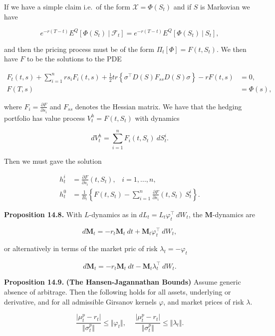 \documentclass[
]{article}
\begin{document}
If we have a simple claim i.e.~of the form \(\mathcal{X}=\Phi(S_t)\) and
if \(S\) is Markovian we have

\[
e^{-r(T-t)}E^Q[\Phi(S_t)\ \vert\ \mathcal{F}_t]=e^{-r(T-t)}E^Q[\Phi(S_t)\ \vert\ S_t],
\]

and then the pricing process must be of the form
\(\Pi_t[\Phi]=F(t,S_t)\). We then have \(F\) to be the solutions to the
PDE

\begin{align*}
F_t(t,s)+\sum_{i=1}^nrs_iF_i(t,s)+\frac{1}{2}tr\left\{\sigma^\top D(S)F_{ss}D(S)\sigma\right\}-rF(t,s)&=0,\\
F(T,s)&=\Phi(s),
\end{align*}

where \(F_i=\frac{\partial F}{\partial s_i}\) and \(F_{ss}\) denotes the
Hessian matrix. We have that the hedging portfolio has value process
\(V_t^h=F(t,S_t)\) with dynamics

\[
dV_t^h=\sum_{i=1}^n F_i(t,S_t)\ dS_t^i.
\]

Then we must gave the solution

\begin{align*}
h_t^i&=\frac{\partial F}{\partial s_i}(t,S_t),\hspace{10pt}i=1,...,n,\\
h_t^0&=\frac{1}{B_t}\left\{F(t,S_t)-\sum_{i=1}^n \frac{\partial F}{\partial s_i}(t,S_t)\ S_t^i\right\}.
\end{align*}

\textbf{Proposition 14.8.} With \(L\)-dynamics as in
\(dL_t=L_t\varphi^\top_t\ dW_t\), the \(\mathbf{M}\)-dynamics are

\[
d\mathbf{M}_t=-r_t\mathbf{M}_t\ dt+\mathbf{M}_t\varphi_t^\top\ dW_t,
\]

or alternatively in terms of the market pric of risk
\(\lambda_t=-\varphi_t\)

\[
d\mathbf{M}_t=-r_t\mathbf{M}_t\ dt-\mathbf{M}_t\lambda_t^\top\ dW_t.
\]

\textbf{Proposition 14.9.} \textbf{(The Hansen-Jagannathan Bounds)}
Assume generic absence of arbitrage. Then the following holds for all
assets, underlying or derivative, and for all admissible Girsanov
kernels \(\varphi\), and market prices of risk \(\lambda\).

\[
\frac{\vert \mu_t^p - r_t\vert}{\Vert \sigma_t ^p\Vert}\le \Vert \varphi_t\Vert,\hspace{15pt} \frac{\vert \mu_t^p - r_t\vert}{\Vert \sigma_t ^p\Vert}\le \Vert \lambda_t\Vert.
\]
\end{document}

